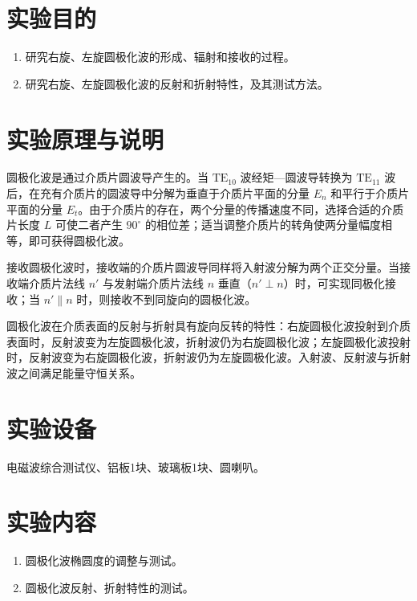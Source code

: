 \documentclass{../ElectromagneticFieldTemplate}
\begin{document}
\maketitle

\section{实验目的}

\begin{enumerate}
    \item 研究右旋、左旋圆极化波的形成、辐射和接收的过程。
    \item 研究右旋、左旋圆极化波的反射和折射特性，及其测试方法。
\end{enumerate}

\section{实验原理与说明}

圆极化波是通过介质片圆波导产生的。当 \(\mathrm{TE}_{10}\) 波经矩—圆波导转换为 \(\mathrm{TE}_{11}\) 波后，在充有介质片的圆波导中分解为垂直于介质片平面的分量 \(E_n\) 和平行于介质片平面的分量 \(E_t\)。由于介质片的存在，两个分量的传播速度不同，选择合适的介质片长度 \(L\) 可使二者产生 \(90^\circ\) 的相位差；适当调整介质片的转角使两分量幅度相等，即可获得圆极化波。

接收圆极化波时，接收端的介质片圆波导同样将入射波分解为两个正交分量。当接收端介质片法线 \(n'\) 与发射端介质片法线 \(n\) 垂直（\(n' \perp n\)）时，可实现同极化接收；当 \(n' \parallel n\) 时，则接收不到同旋向的圆极化波。

圆极化波在介质表面的反射与折射具有旋向反转的特性：右旋圆极化波投射到介质表面时，反射波变为左旋圆极化波，折射波仍为右旋圆极化波；左旋圆极化波投射时，反射波变为右旋圆极化波，折射波仍为左旋圆极化波。入射波、反射波与折射波之间满足能量守恒关系。

\section{实验设备}

电磁波综合测试仪、铝板1块、玻璃板1块、圆喇叭。

\section{实验内容}

\begin{enumerate}
    \item 圆极化波椭圆度的调整与测试。
    \item 圆极化波反射、折射特性的测试。
\end{enumerate}
\end{document}
